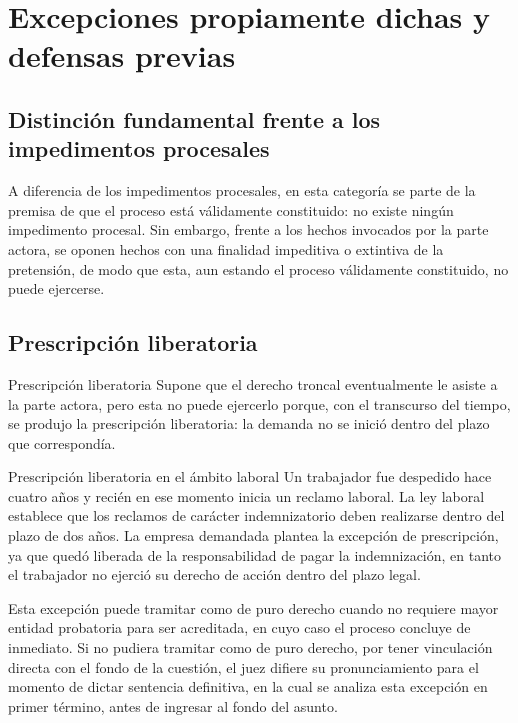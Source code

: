 \documentclass[12pt,oneside]{book}
\begin{document}
\chapter{Excepciones propiamente dichas y defensas previas}

\section{Distinción fundamental frente a los impedimentos procesales}

\begin{important}
A diferencia de los impedimentos procesales, en esta categoría se parte de la premisa de que el proceso está válidamente constituido: no existe ningún impedimento procesal. Sin embargo, frente a los hechos invocados por la parte actora, se oponen hechos con una finalidad impeditiva o extintiva de la pretensión, de modo que esta, aun estando el proceso válidamente constituido, no puede ejercerse.
\end{important}

\section{Prescripción liberatoria}

\begin{definition}{Prescripción liberatoria}
Supone que el derecho troncal eventualmente le asiste a la parte actora, pero esta no puede ejercerlo porque, con el transcurso del tiempo, se produjo la prescripción liberatoria: la demanda no se inició dentro del plazo que correspondía.
\end{definition}

\begin{example}{Prescripción liberatoria en el ámbito laboral}
Un trabajador fue despedido hace cuatro años y recién en ese momento inicia un reclamo laboral. La ley laboral establece que los reclamos de carácter indemnizatorio deben realizarse dentro del plazo de dos años. La empresa demandada plantea la excepción de prescripción, ya que quedó liberada de la responsabilidad de pagar la indemnización, en tanto el trabajador no ejerció su derecho de acción dentro del plazo legal.
\end{example}

Esta excepción puede tramitar como de puro derecho \textemdash{}cuando no requiere mayor entidad probatoria para ser acreditada\textemdash{}, en cuyo caso el proceso concluye de inmediato. Si no pudiera tramitar como de puro derecho, por tener vinculación directa con el fondo de la cuestión, el juez difiere su pronunciamiento para el momento de dictar sentencia definitiva, en la cual se analiza esta excepción en primer término, antes de ingresar al fondo del asunto.
\end{document}
